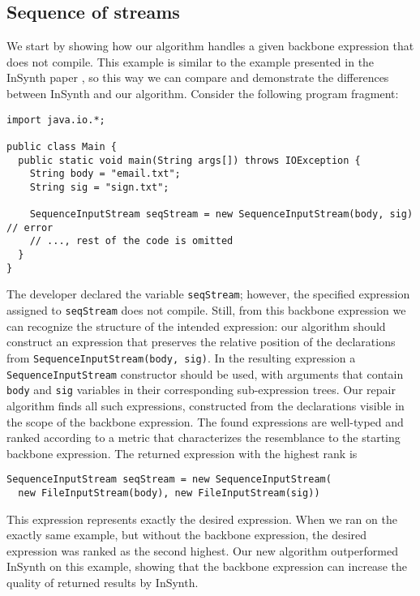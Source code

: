 \subsection{Sequence of streams}

We start by showing how our algorithm handles a given backbone 
expression that does not compile. This example is similar to the 
example presented in the InSynth paper
\cite{GveroETAL13CompleteCompletionTypesWeights}, so this way we can compare and 
demonstrate the differences between InSynth and our algorithm. Consider the following program fragment:
\begin{lstlisting}
import java.io.*;

public class Main {
  public static void main(String args[]) throws IOException {
    String body = "email.txt";
    String sig = "sign.txt";
    
    SequenceInputStream seqStream = new SequenceInputStream(body, sig) // error
    // ..., rest of the code is omitted
  }
} 
\end{lstlisting}
The developer declared the variable \lstinline{seqStream}; however, the specified 
expression assigned to \lstinline{seqStream} does not compile. Still, from this backbone expression 
we can recognize the structure of the intended expression: our algorithm should construct 
an expression that preserves the relative position of the declarations from 
\lstinline{SequenceInputStream(body, sig)}. In the resulting expression a \lstinline{SequenceInputStream} constructor
should be used, with arguments that contain \lstinline{body} and \lstinline{sig} variables in their
corresponding sub-expression trees. Our repair algorithm finds all such expressions, 
constructed from the
declarations visible in the scope of the backbone expression. The found expressions are well-typed 
and ranked according to a metric that characterizes the
resemblance to the starting backbone expression.
The returned expression with the highest rank is
\begin{lstlisting}
SequenceInputStream seqStream = new SequenceInputStream(
  new FileInputStream(body), new FileInputStream(sig))
\end{lstlisting}
This expression represents exactly the desired expression.
When we ran \cite{GveroETAL13CompleteCompletionTypesWeights} on the exactly same example, but without 
the backbone expression, the desired expression was
ranked as the second highest. Our new algorithm outperformed InSynth on this example, showing
that the backbone expression can increase the quality of returned results by InSynth.

